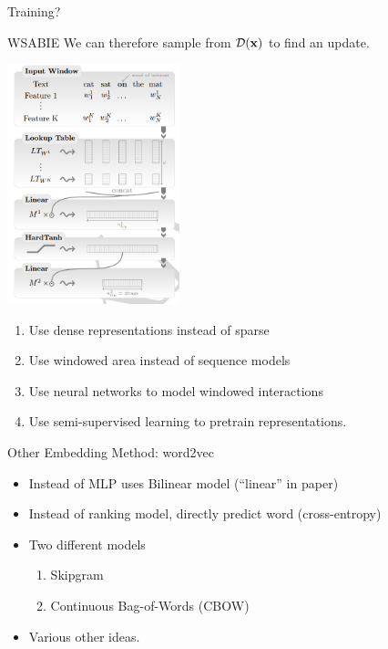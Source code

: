 \documentclass{beamer}
\begin{document}
\begin{frame}{Training?}
\begin{frame}{WSABIE}
  We can therefore sample from $\mathcal{D}(\mathbf{x})$ to find an update.

\end{frame}

\begin{frame}
  \begin{center}
    \includegraphics[width=5cm]{cwfull}
  \end{center}
  \begin{enumerate}
  \item Use dense representations instead of sparse
  \item Use windowed area instead of sequence models
  \item Use neural networks to model windowed interactions
  \item Use semi-supervised learning to pretrain representations.
  \end{enumerate}
\end{frame}

\begin{frame}{Other Embedding Method: word2vec}
  \begin{itemize}
  \item Instead of MLP uses Bilinear model (``linear'' in paper)
    \air

  \item Instead of ranking model, directly predict word (cross-entropy)
    \air

  \item Two different models
    \begin{enumerate}
    \item Skipgram
    \item Continuous Bag-of-Words (CBOW)
    \end{enumerate}

  \item Various other ideas.


\end{itemize}
\end{frame}
\end{frame}
\end{document}
